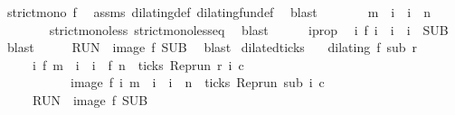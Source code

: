 \begin{isabellebody}
\ {\isacartoucheopen}strict{\isacharunderscore}mono\ f{\isacartoucheclose}\ \isamarkupfalse%
\ assms\ dilating{\isacharunderscore}def\ dilating{\isacharunderscore}fun{\isacharunderscore}def\ \isamarkupfalse%
\ blast\isanewline
\ \ \ \ \isamarkupfalse%
\ \isamarkupfalse%
\ {\isacartoucheopen}m\ {\isacharless}\ i\ {\isasymand}\ i\ {\isasymle}\ n{\isacartoucheclose}\isanewline
\ \ \ \ \ \ \isamarkupfalse%
\ strict{\isacharunderscore}mono{\isacharunderscore}less\ strict{\isacharunderscore}mono{\isacharunderscore}less{\isacharunderscore}eq\ \isamarkupfalse%
\ blast\isanewline
\ \ \ \ \isamarkupfalse%
\ i{}prop\ \isamarkupfalse%
\ {\isacartoucheopen}{\isasymexists}i\ f\ i\ {\isacharequal}\ i\ {\isasymand}\ i\ {\isasymin}\ {\isacharquery}SUB{\isacartoucheclose}\ \isamarkupfalse%
\ blast\isanewline
\ \ \isacommand{{\isacharbraceright}}\isamarkupfalse%
\ \isamarkupfalse%
\ {\isacartoucheopen}{\isacharquery}RUN\ {\isasymsubseteq}\ image\ f\ {\isacharquery}SUB{\isacartoucheclose}\ \isamarkupfalse%
\ blast\isanewline
{}\isamarkupfalse%
%
\endisatagproof
{\isafoldproof}%
%
\isadelimproof
\isanewline
%
\endisadelimproof
\isanewline
{}\isamarkupfalse%
\ dilated{\isacharunderscore}ticks{\isacharcolon}\isanewline
\ \ \ {\isacartoucheopen}dilating\ f\ sub\ r{\isacartoucheclose}\isanewline
\ \ \ \ \ {\isacartoucheopen}{\isacharbraceleft}i{\isachardot}\ f\ m\ {\isasymle}\ i\ {\isasymand}\ i\ {\isasymle}\ f\ n\ {\isasymand}\ ticks\ {\isacharparenleft}{\isacharparenleft}Rep{\isacharunderscore}run\ r{\isacharparenright}\ i\ c{\isacharparenright}{\isacharbraceright}\isanewline
\ \ \ \ \ \ \ \ \ \ {\isacharequal}\ image\ f\ {\isacharbraceleft}i{\isachardot}\ m\ {\isasymle}\ i\ {\isasymand}\ i\ {\isasymle}\ n\ {\isasymand}\ ticks\ {\isacharparenleft}{\isacharparenleft}Rep{\isacharunderscore}run\ sub{\isacharparenright}\ i\ c{\isacharparenright}{\isacharbraceright}{\isacartoucheclose}\isanewline
\ \ \ \ {\isacharparenleft}\ {\isacartoucheopen}{\isacharquery}RUN\ {\isacharequal}\ image\ f\ {\isacharquery}SUB{\isacartoucheclose}{\isacharparenright}\isanewline
%
\isadelimproof
%
\endisadelimproof
%
\isatagproof
{}\isamarkupfalse%
\isanewline
\ \ \isacommand{{\isacharbraceleft}}\isamarkupfalse%

\end{isabellebody}
